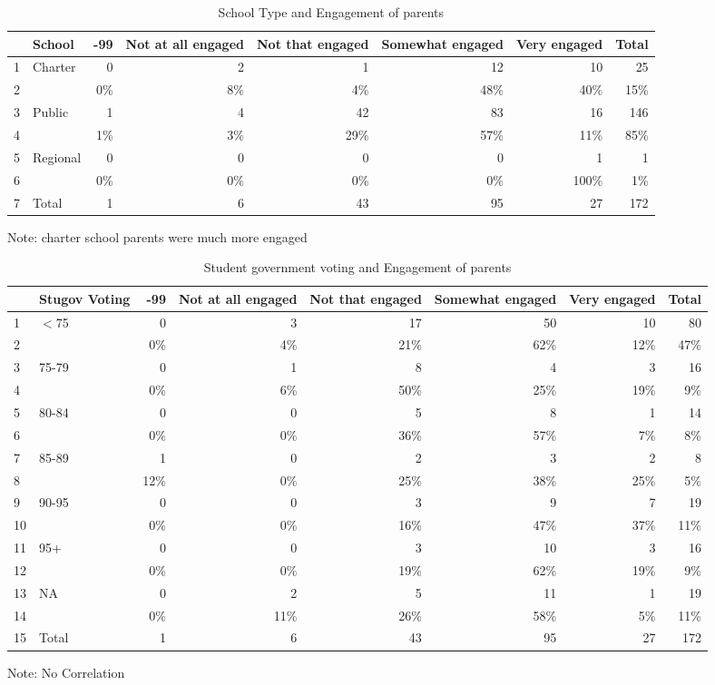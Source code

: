 \documentclass[12pt]{article}
\begin{document}
\begin{table}[ht]
\caption{School Type and Engagement of parents}
\centering
\begin{tabular}{llrrrrrr}
  \hline
 & School & -99 & Not at all engaged & Not that engaged & Somewhat engaged & Very engaged & Total \\ 
  \hline
1 & Charter & 0 & 2 & 1 & 12 & 10 & 25 \\ 
  2 &   & 0\% & 8\% & 4\% & 48\% & 40\% & 15\% \\ 
  3 & Public & 1 & 4 & 42 & 83 & 16 & 146 \\ 
  4 &   & 1\% & 3\% & 29\% & 57\% & 11\% & 85\% \\ 
  5 & Regional & 0 & 0 & 0 & 0 & 1 & 1 \\ 
  6 &   & 0\% & 0\% & 0\% & 0\% & 100\% & 1\% \\ 
  7 & Total & 1 & 6 & 43 & 95 & 27 & 172 \\ 
   \hline
\end{tabular}
\begin{tablenotes}
      \small
      \item Note: charter school parents were much more engaged
    \end{tablenotes}
\end{table}


\begin{table}[ht]
\caption{Student government voting and Engagement of parents} 
\centering
\begin{tabular}{llrrrrrr}
  \hline
 & Stugov Voting & -99 & Not at all engaged & Not that engaged & Somewhat engaged & Very engaged & Total \\ 
  \hline
1 & $<$75 & 0 & 3 & 17 & 50 & 10 & 80 \\ 
  2 &   & 0\% & 4\% & 21\% & 62\% & 12\% & 47\% \\ 
  3 & 75-79 & 0 & 1 & 8 & 4 & 3 & 16 \\ 
  4 &   & 0\% & 6\% & 50\% & 25\% & 19\% & 9\% \\ 
  5 & 80-84 & 0 & 0 & 5 & 8 & 1 & 14 \\ 
  6 &   & 0\% & 0\% & 36\% & 57\% & 7\% & 8\% \\ 
  7 & 85-89 & 1 & 0 & 2 & 3 & 2 & 8 \\ 
  8 &   & 12\% & 0\% & 25\% & 38\% & 25\% & 5\% \\ 
  9 & 90-95 & 0 & 0 & 3 & 9 & 7 & 19 \\ 
  10 &   & 0\% & 0\% & 16\% & 47\% & 37\% & 11\% \\ 
  11 & 95+ & 0 & 0 & 3 & 10 & 3 & 16 \\ 
  12 &   & 0\% & 0\% & 19\% & 62\% & 19\% & 9\% \\ 
  13 & NA & 0 & 2 & 5 & 11 & 1 & 19 \\ 
  14 &   & 0\% & 11\% & 26\% & 58\% & 5\% & 11\% \\ 
  15 & Total & 1 & 6 & 43 & 95 & 27 & 172 \\ 
   \hline
\end{tabular}
\begin{tablenotes}
      \small
      \item Note: No Correlation
    \end{tablenotes}
\end{table}
\end{document}
